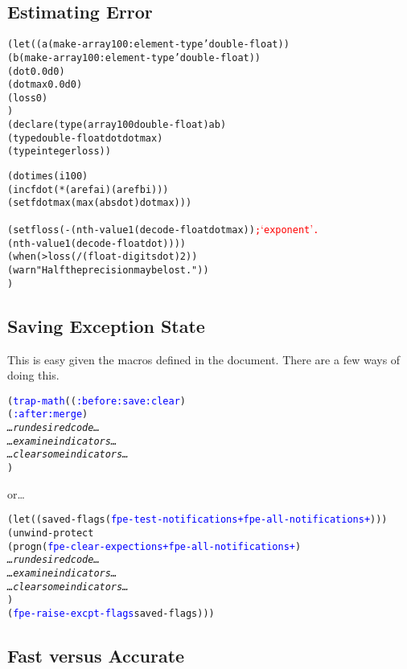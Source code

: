 \documentclass[10pt,fleqn]{article}
\newcommand{\codelia}[1]{\textcolor{blue}{#1}}
\begin{document}
\subsection{Estimating Error}

\begin{alltt}
    (let ((a (make-array 100 :element-type 'double-float))
          (b (make-array 100 :element-type 'double-float))
          (dot 0.0d0)
          (dotmax 0.0d0)
          (loss 0)
         )
      (declare (type (array 100 double-float) a b)
               (type double-float dot dotmax)
               (type integer loss))
     
      (dotimes (i 100)
         (incf dot (* (aref a i) (aref b i)))
         (setf dotmax (max (abs dot) dotmax)))

      (setf loss (- (nth-value 1 (decode-float dotmax)) \textcolor{red}{; `exponent'.}
                    (nth-value 1 (decode-float dot))))
      (when (> loss (/ (float-digits dot) 2))
         (warn "Half the precision may be lost."))
      )
\end{alltt}


\subsection{Saving Exception State}

This is easy given the macros defined in the document.  There are a
few ways of doing this.

\begin{alltt}
    (\codelia{trap-math} ((\codelia{:before :save :clear})
                          (\codelia{:after :merge})
       \textit{\ldots run desired code \ldots}
       \textit{\ldots examine indicators \ldots}
       \textit{\ldots clear some indicators \ldots}
       )
\end{alltt}
or\ldots
\begin{alltt}
    (let ((saved-flags (\codelia{fpe-test-notifications +fpe-all-notifications+})))
       (unwind-protect
           (progn (\codelia{fpe-clear-expections +fpe-all-notifications+})
                  \textit{\ldots run desired code \ldots}
                  \textit{\ldots examine indicators \ldots}
                  \textit{\ldots clear some indicators \ldots}
                  )
         (\codelia{fpe-raise-excpt-flags} saved-flags)))
\end{alltt}


\subsection{Fast versus Accurate}
\end{document}
